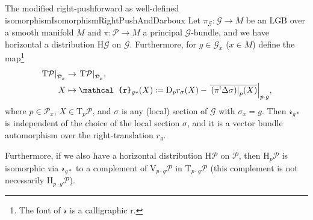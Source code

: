\documentclass[reqno,a4paper,oneside]{amsart}
\theoremstyle{plain}
\theoremstyle{remark}
\theoremstyle{definition}
\begin{document}
\begin{propositions}{The modified right-pushforward as well-defined isomorphism}{IsomorphismRightPushAndDarboux}
Let $\pi_{\mathcal{G}} \colon \mathcal{G} \to M$ be an LGB over a smooth manifold $M$ and $\pi\colon\mathcal{P} \to M$ a principal $\mathcal{G}$-bundle, and we have horizontal a distribution $\mathrm{H}\mathcal{G}$ on $\mathcal{G}$. Furthermore, for $g \in \mathcal{G}_x$ ($x \in M$) define the map\footnote{The font of $\mathcal{r}$ is a calligraphic r.}
\begin{align*}
\mleft.\mathrm{T}\mathcal{P}\mright|_{\mathcal{P}_x} &\to \mleft.\mathrm{T}\mathcal{P}\mright|_{\mathcal{P}_x},\\
X 
&\mapsto 
\mathcal{r}_{g*}(X) 
\coloneqq
\mathrm{D}_pr_\sigma\mleft( 
	X 
\mright)
	- \mleft.{\overline{
		\mleft. \mleft( \pi^!\Delta\sigma \mright) \mright|_p(X)
	}}\mright|_{p \cdot g},
\end{align*}
where $p \in \mathcal{P}_x$, $X \in \mathrm{T}_p \mathcal{P}$, and $\sigma$ is any (local) section of $\mathcal{G}$ with $\sigma_x = g$. Then $\mathcal{r}_{g*}$ is independent of the choice of the local section $\sigma$, and it is a vector bundle automorphism over the right-translation $r_g$. 

Furthermore, if we also have a horizontal distribution $\mathrm{H}\mathcal{P}$ on $\mathcal{P}$, then $\mathrm{H}_p\mathcal{P}$ is isomorphic via $\mathcal{r}_{g*}$ to a complement of $\mathrm{V}_{p \cdot g} \mathcal{P}$ in $\mathrm{T}_{p \cdot g}\mathcal{P}$ (this complement is not necessarily $\mathrm{H}_{p \cdot g}\mathcal{P}$).
\end{propositions}
\end{document}

